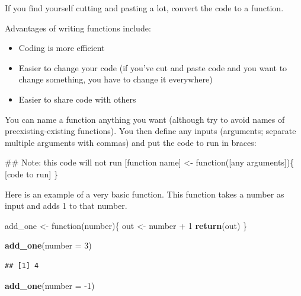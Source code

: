 \documentclass[]{book}
\makeatletter
\newenvironment{Shaded}{\begin{snugshade}}{\end{snugshade}}
\newcommand{\KeywordTok}[1]{\textcolor[rgb]{0.13,0.29,0.53}{\textbf{{#1}}}}
\newcommand{\DataTypeTok}[1]{\textcolor[rgb]{0.13,0.29,0.53}{{#1}}}
\newcommand{\DecValTok}[1]{\textcolor[rgb]{0.00,0.00,0.81}{{#1}}}
\newcommand{\StringTok}[1]{\textcolor[rgb]{0.31,0.60,0.02}{{#1}}}
\newcommand{\NormalTok}[1]{{#1}}
\providecommand{\tightlist}{%
  \setlength{\itemsep}{0pt}\setlength{\parskip}{0pt}}
\newenvironment{kframe}{%
\medskip{}
\setlength{\fboxsep}{.8em}
 \def\at@end@of@kframe{}%
 \ifinner\ifhmode%
  \def\at@end@of@kframe{\end{minipage}}%
  \begin{minipage}{\columnwidth}%
 \fi\fi%
 \def\FrameCommand##1{\hskip\@totalleftmargin \hskip-\fboxsep
 \colorbox{shadecolor}{##1}\hskip-\fboxsep
     \hskip-\linewidth \hskip-\@totalleftmargin \hskip\columnwidth}%
 \MakeFramed {\advance\hsize-\width
   \@totalleftmargin\z@ \linewidth\hsize
   \@setminipage}}%
 {\par\unskip\endMakeFramed%
 \at@end@of@kframe}
\renewenvironment{Shaded}{\begin{kframe}}{\end{kframe}}
\makeatother
\begin{document}
\bigskip 

If you find yourself cutting and pasting a lot, convert the code to a
function.

Advantages of writing functions include:

\begin{itemize}
\tightlist
\item
  Coding is more efficient
\item
  Easier to change your code (if you've cut and paste code and you want
  to change something, you have to change it everywhere)
\item
  Easier to share code with others
\end{itemize}

You can name a function anything you want (although try to avoid names
of preexisting-existing functions). You then define any inputs
(arguments; separate multiple arguments with commas) and put the code to
run in braces:

\begin{Shaded}
\begin{Highlighting}[]
\NormalTok{## Note: this code will not run}
\NormalTok{[function name] <-}\StringTok{ }\NormalTok{function([any arguments])\{}
        \NormalTok{[code to run]}
\NormalTok{\}}
\end{Highlighting}
\end{Shaded}

Here is an example of a very basic function. This function takes a
number as input and adds 1 to that number.

\begin{Shaded}
\begin{Highlighting}[]
\NormalTok{add_one <-}\StringTok{ }\NormalTok{function(number)\{}
        \NormalTok{out <-}\StringTok{ }\NormalTok{number +}\StringTok{ }\DecValTok{1}
        \KeywordTok{return}\NormalTok{(out)}
\NormalTok{\}}

\KeywordTok{add_one}\NormalTok{(}\DataTypeTok{number =} \DecValTok{3}\NormalTok{)}
\end{Highlighting}
\end{Shaded}

\begin{verbatim}
## [1] 4
\end{verbatim}

\begin{Shaded}
\begin{Highlighting}[]
\KeywordTok{add_one}\NormalTok{(}\DataTypeTok{number =} \NormalTok{-}\DecValTok{1}\NormalTok{)}
\end{Highlighting}
\end{Shaded}
\end{document}
